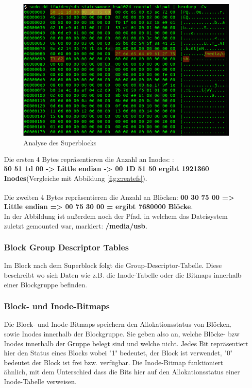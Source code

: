 \begin{figure}[H]
	\centering
	\includegraphics[width=12cm,keepaspectratio=true]{pictures/superblock.png}
	\caption{
		Analyse des Superblocks
	}
	\label{fig:superblock}
\end{figure}

Die ersten 4 Bytes repräsentieren die Anzahl an Inodes: \cite{Ext2.07.01.2022}:\\
\textbf{50 51 1d 00 -> Little endian -> 00 1D 51 50 ergibt 1921360 Inodes}(Vergleiche mit Abbildung \ref{fig:createfs}).\\\\
Die zweiten 4 Bytes repräsentieren die Anzahl an Blöcken:
\textbf{00 30 75 00 => Little endian => 00 75 30 00 = ergibt 7680000 Blöcke}. \\

In der Abbildung ist außerdem noch der Pfad, in welchem das Dateisystem zuletzt gemounted war, markiert: \textbf{/media/usb}.

\subsubsection{Block Group Descriptor Tables}

Im Block nach dem Superblock folgt die Group-Descriptor-Tabelle. Diese beschreibt wo sich Daten wie z.B. die Inode-Tabelle oder die Bitmaps innerhalb einer Blockgruppe befinden. 


\subsubsection{Block- und Inode-Bitmaps}

Die Block- und Inode-Bitmaps speichern den Allokationsstatus von Blöcken, sowie Inodes innerhalb der Blockgruppe. Sie geben also an, welche Blöcke- bzw Inodes innerhalb der Gruppe belegt sind und welche nicht. Jedes Bit repräsentiert hier den Status eines Blocks wobei "1" bedeutet, der Block ist verwendet, "0" bedeutet der Block ist frei bzw. verfügbar. Die Inode-Bitmap funktioniert ähnlich, mit dem Unterschied dass die Bits hier auf den Allokationsstatus einer Inode-Tabelle verweisen.

